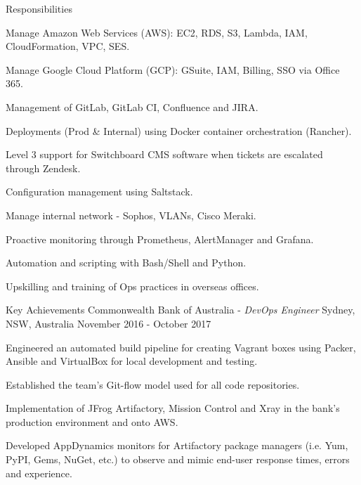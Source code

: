 \begin{cventries}
  \cventry
  {Responsibilities} %
  {} %
  {} %
  {} %
  {
    \begin{cvitems} %
      \item {Manage Amazon Web Services (AWS): EC2, RDS, S3, Lambda, IAM, CloudFormation, VPC, SES.}
      \item {Manage Google Cloud Platform (GCP): GSuite, IAM, Billing, SSO via Office 365.}
      \item {Management of GitLab, GitLab CI, Confluence and JIRA.}
      \item {Deployments (Prod \& Internal) using Docker container orchestration (Rancher).}
      \item {Level 3 support for Switchboard CMS software when tickets are escalated through Zendesk.}
      \item {Configuration management using Saltstack.}
      \item {Manage internal network - Sophos, VLANs, Cisco Meraki.}
      \item {Proactive monitoring through Prometheus, AlertManager and Grafana.}
      \item {Automation and scripting with Bash/Shell and Python.}
      \item {Upskilling and training of Ops practices in overseas offices.}
    \end{cvitems}
  }

  \cventry
  {Key Achievements} %
  {Commonwealth Bank of Australia - \emph{DevOps Engineer}} %
  {Sydney, NSW, Australia} %
  {November 2016 - October 2017} %
  {
    \begin{cvitems} %
      \item {Engineered an automated build pipeline for creating Vagrant boxes using Packer, Ansible and VirtualBox for local development and testing.}
      \item {Established the team's Git-flow model used for all code repositories.}
      \item {Implementation of JFrog Artifactory, Mission Control and Xray in the bank's production environment and onto AWS.}
      \item {Developed AppDynamics monitors for Artifactory package managers (i.e. Yum, PyPI, Gems, NuGet, etc.) to observe and mimic end-user response times, errors and experience.}    \end{cvitems}
  }


\end{cventries}
